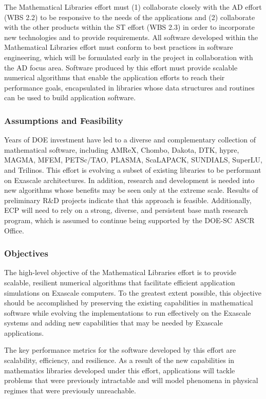 The Mathematical Libraries effort must (1) collaborate closely with the AD effort (WBS 2.2) to be responsive to the needs of the applications and (2) collaborate with the other products within the ST effort (WBS 2.3) in order to incorporate new technologies and to provide requirements. All software developed within the Mathematical Libraries effort must conform to best practices in software engineering, which will be formulated early in the project in collaboration with the AD focus area. Software produced by this effort must provide scalable numerical algorithms that enable the application efforts to reach their performance goals, encapsulated in libraries whose data structures and routines can be used to build application software.

\subsubsection{Assumptions and Feasibility}
Years of DOE investment have led to a diverse and complementary collection of mathematical software, including AMReX, Chombo, Dakota, DTK, hypre, MAGMA, MFEM, PETSc/TAO, PLASMA, ScaLAPACK, SUNDIALS, SuperLU, and Trilinos. This effort is evolving a subset of existing libraries to be performant on Exascale architectures. In addition, research and development is needed into new algorithms whose benefits may be seen only at the extreme scale. Results of preliminary R\&D projects indicate that this approach is feasible.  Additionally, ECP will need to rely on a strong, diverse, and persistent base math research program, which is assumed to continue being supported by the DOE-SC ASCR Office. 

\subsubsection{Objectives}
The high-level objective of the Mathematical Libraries effort is to provide scalable, resilient numerical algorithms that facilitate efficient application simulations on Exascale computers. To the greatest extent possible, this objective should be accomplished by preserving the existing capabilities in mathematical software while evolving the implementations to run effectively on the Exascale systems and adding new capabilities that may be needed by Exascale applications.

The key performance metrics for the software developed by this effort are scalability, efficiency, and resilience. As a result of the new capabilities in mathematics libraries developed under this effort, applications will tackle problems that were previously intractable and will model phenomena in physical regimes that were previously unreachable.

